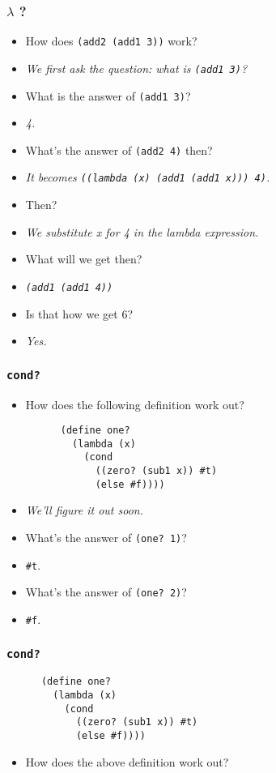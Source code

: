 \begin{frame}[fragile]
  \frametitle{$\lambda$ ?}
    \begin{itemize}
      \item How does \texttt{(add2 (add1 3))} work?
      \item \emph{We first ask the question: what is \texttt{(add1 3)}?}
      \pause
      \item What is the answer of \texttt{(add1 3)}?
      \item \emph{4.}
      \pause
      \item What's the answer of \texttt{(add2 4)} then?
      \item \emph{It becomes \texttt{((lambda (x) (add1 (add1 x))) 4)}.}
      \pause
      \item Then?
      \item \emph{We substitute \textrm{x} for \textrm{4} in the \textrm{lambda expression}.}
      \pause
      \item What will we get then?
      \item \emph{\texttt{(add1 (add1 4))}}
      \pause
      \item Is that how we get 6?
      \item \emph{Yes.}
    \end{itemize}
\end{frame}

\begin{frame}[fragile]
  \frametitle{\texttt{cond?}}
  \begin{itemize}
    \item How does the following definition work out?
    \begin{verbatim}
      (define one?
        (lambda (x)
          (cond
            ((zero? (sub1 x)) #t)
            (else #f))))
    \end{verbatim}
    \item \emph{We'll figure it out soon\texttrademark.}
    \pause
    \item What's the answer of \texttt{(one? 1)}?
    \item \texttt{#t}.
    \pause
    \item What's the answer of \texttt{(one? 2)}?
    \item \texttt{#f}.
  \end{itemize}
\end{frame}

\begin{frame}[fragile]
  \frametitle{\texttt{cond?}}
    \begin{verbatim}
      (define one?
        (lambda (x)
          (cond
            ((zero? (sub1 x)) #t)
            (else #f))))
    \end{verbatim}
  \begin{itemize}
    \item How does the above definition work out?
  \end{itemize}
\end{frame}
